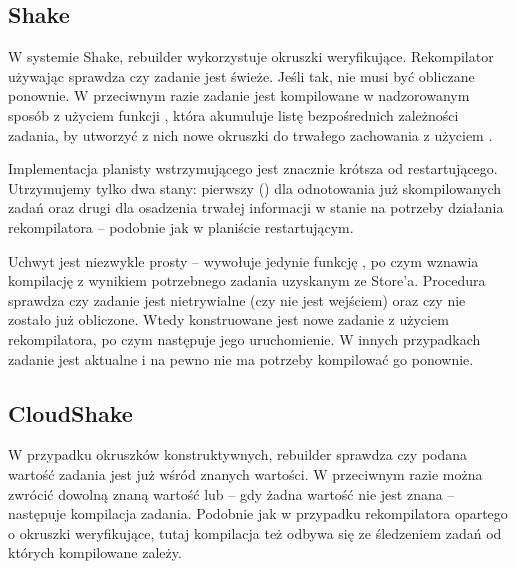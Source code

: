 \subsection{Shake}



W systemie Shake, rebuilder wykorzystuje okruszki weryfikujące. Rekompilator używając  sprawdza czy zadanie jest świeże. Jeśli tak, nie musi być obliczane ponownie. W przeciwnym razie zadanie jest kompilowane w nadzorowanym sposób z użyciem funkcji , która akumuluje listę bezpośrednich zależności zadania, by utworzyć z nich nowe okruszki do trwałego zachowania z użyciem .

\pagebreak



Implementacja planisty wstrzymującego jest znacznie krótsza od restartującego. Utrzymujemy tylko dwa stany: pierwszy () dla odnotowania już skompilowanych zadań oraz drugi dla osadzenia trwałej informacji w stanie na potrzeby działania rekompilatora -- podobnie jak w planiście restartującym.



Uchwyt  jest niezwykle prosty -- wywołuje jedynie funkcję , po czym wznawia kompilację z wynikiem potrzebnego zadania uzyskanym ze Store'a. Procedura  sprawdza czy zadanie jest nietrywialne (czy nie jest wejściem) oraz czy nie zostało już obliczone. Wtedy konstruowane jest nowe zadanie z użyciem rekompilatora, po czym następuje jego uruchomienie. W innych przypadkach zadanie jest aktualne i na pewno nie ma potrzeby kompilować go ponownie.

\subsection{CloudShake}





W przypadku okruszków konstruktywnych, rebuilder sprawdza czy podana wartość zadania jest już wśród znanych wartości. W przeciwnym razie można zwrócić dowolną znaną wartość lub -- gdy żadna wartość nie jest znana -- następuje kompilacja zadania. Podobnie jak w przypadku rekompilatora opartego o okruszki weryfikujące, tutaj kompilacja też odbywa się ze śledzeniem zadań od których kompilowane zależy.

